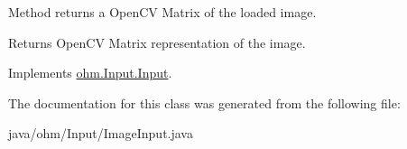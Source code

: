 Method returns a Open\+CV Matrix of the loaded image. \begin{DoxyReturn}{Returns}
Open\+CV Matrix representation of the image. 
\end{DoxyReturn}


Implements \hyperlink{interfaceohm_1_1_input_1_1_input_a9e65aa172b8ea1add3c2f09df554f198}{ohm.\+Input.\+Input}.



The documentation for this class was generated from the following file\+:\begin{DoxyCompactItemize}
\item 
java/ohm/\+Input/Image\+Input.\+java\end{DoxyCompactItemize}
